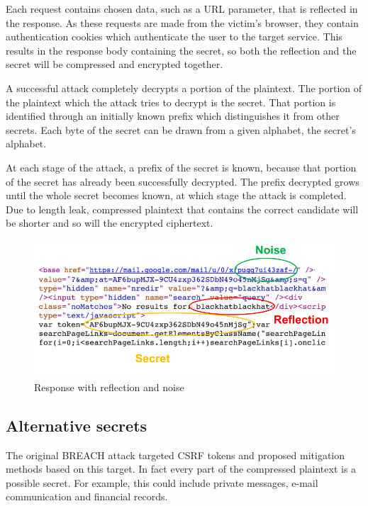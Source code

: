 \documentclass[a4paper, 11 pt, conference]{article}  %
\begin{document}
Each request contains chosen data, such as a URL parameter, that is reflected in the
response. As these requests are made from the victim's browser, they contain
authentication cookies which authenticate the user to the target service.
This results in the
response body containing the secret, so both the reflection and the secret will be
compressed and encrypted together.

A successful attack completely decrypts a portion of the plaintext. The portion
of the plaintext which the attack tries to decrypt is the secret. That portion
is identified through an initially known prefix which distinguishes it from
other secrets. Each byte of the
secret can be drawn from a given alphabet, the secret's alphabet.

At each stage of the attack, a prefix of the secret is known, because that
portion of the secret has already been successfully decrypted. The prefix
decrypted grows until the whole secret becomes known, at which stage the attack
is completed. Due to length leak, compressed plaintext
that contains the correct candidate will be shorter and so will the encrypted ciphertext.

   \begin{figure}[thpb]
      \centering
      \includegraphics[width=1\textwidth]{figures/reflection.png}
      \caption{Response with reflection and noise}
   \end{figure}

\subsection{Alternative secrets}

The original BREACH attack targeted CSRF tokens and proposed mitigation methods based on this target.
In fact every part of the compressed plaintext is a possible secret. For
example, this could include private messages, e-mail communication and financial records.
\end{document}
